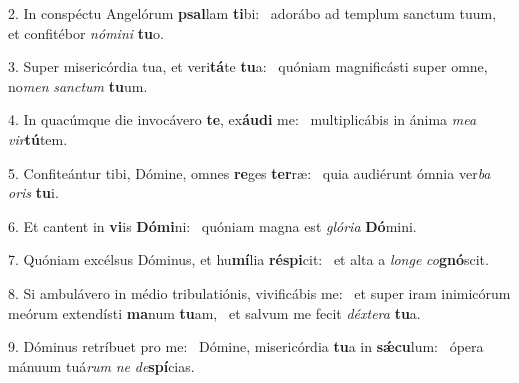 2. In conspéctu Angelórum \textbf{psal}lam \textbf{ti}bi: \ast\  adorábo ad templum sanctum tuum, et confitébor \textit{nó}\textit{mi}\textit{ni} \textbf{tu}o.\

3. Super misericórdia tua, et veri\textbf{tá}te \textbf{tu}a: \ast\  quóniam magnificásti super omne, no\textit{men} \textit{sanc}\textit{tum} \textbf{tu}um.\

4. In quacúmque die invocávero \textbf{te}, ex\textbf{áu}\textbf{di} me: \ast\  multiplicábis in ánima \textit{me}\textit{a} \textit{vir}\textbf{tú}tem.\

5. Confiteántur tibi, Dómine, omnes \textbf{re}ges \textbf{ter}ræ: \ast\  quia audiérunt ómnia ver\textit{ba} \textit{o}\textit{ris} \textbf{tu}i.\

6. Et cantent in \textbf{vi}is \textbf{Dó}\textbf{mi}ni: \ast\  quóniam magna est \textit{gló}\textit{ri}\textit{a} \textbf{Dó}mini.\

7. Quóniam excélsus Dóminus, et hu\textbf{mí}lia \textbf{ré}\textbf{spi}cit: \ast\  et alta a \textit{lon}\textit{ge} \textit{co}\textbf{gnó}scit.\

8. Si ambulávero in médio tribulatiónis, vivificábis me: \dag\  et super iram inimicórum meórum extendísti \textbf{ma}num \textbf{tu}am, \ast\  et salvum me fecit \textit{déx}\textit{te}\textit{ra} \textbf{tu}a.\

9. Dóminus retríbuet pro me: \dag\  Dómine, misericórdia \textbf{tu}a in \textbf{sǽ}\textbf{cu}lum: \ast\  ópera mánuum tuá\textit{rum} \textit{ne} \textit{de}\textbf{spí}cias.\

